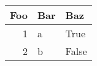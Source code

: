 
\begin{tabular}{rll}
\toprule
Foo & Bar & Baz \\
\midrule

1 & a & True \\

2 & b & False \\

\bottomrule
\end{tabular}
